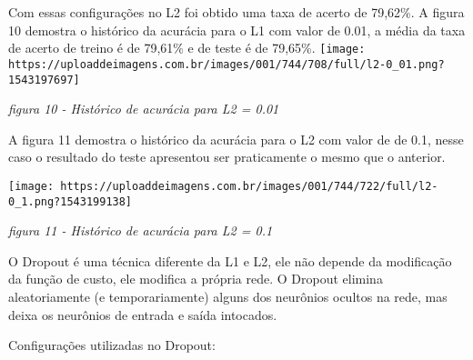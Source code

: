 \documentclass[11pt]{article}
\makeatletter
\def\maxwidth{\ifdim\Gin@nat@width>\linewidth\linewidth
    \else\Gin@nat@width\fi}
\let\Oldincludegraphics\includegraphics
\renewcommand{\includegraphics}[1]{\Oldincludegraphics[width=.8\maxwidth]{#1}}
\makeatother
\begin{document}
    Com essas configurações no L2 foi obtido uma taxa de acerto de 79,62\%.
A figura 10 demostra o histórico da acurácia para o L1 com valor de
0.01, a média da taxa de acerto de treino é de 79,61\% e de teste é de
79,65\%.
\texttt{[image: https://uploaddeimagens.com.br/images/001/744/708/full/l2-0\_01.png?1543197697]}

\emph{figura 10 - Histórico de acurácia para L2 = 0.01}

A figura 11 demostra o histórico da acurácia para o L2 com valor de de
0.1, nesse caso o resultado do teste apresentou ser praticamente o mesmo
que o anterior.

\texttt{[image: https://uploaddeimagens.com.br/images/001/744/722/full/l2-0\_1.png?1543199138]}

\emph{figura 11 - Histórico de acurácia para L2 = 0.1}

    O Dropout é uma técnica diferente da L1 e L2, ele não depende da
modificação da função de custo, ele modifica a própria rede. O Dropout
elimina aleatoriamente (e temporariamente) alguns dos neurônios ocultos
na rede, mas deixa os neurônios de entrada e saída intocados.

Configurações utilizadas no Dropout:
\end{document}

